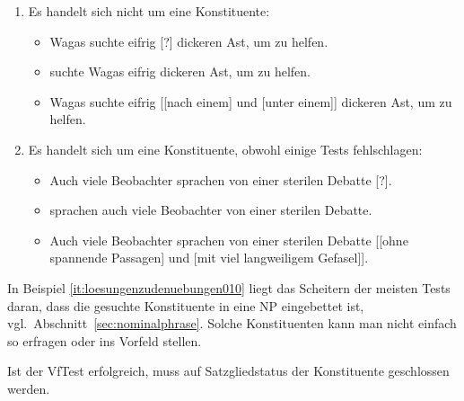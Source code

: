 \begin{enumerate}
\begin{itemize}
    \end{itemize}
  \item Es handelt sich nicht um eine Konstituente:
    \begin{itemize}
      \item \PronTest \Ast Wagas suchte eifrig [?] dickeren Ast, um zu helfen.
      \item \VfTest {} suchte Wagas eifrig dickeren Ast, um zu helfen.
      \item \KoorTest \Ast Wagas suchte eifrig [[nach einem] und [unter einem]] dickeren Ast, um zu helfen.
    \end{itemize}
  \item\label{it:loesungenzudenuebungen010} Es handelt sich um eine Konstituente, obwohl einige Tests fehlschlagen:
    \begin{itemize}
      \item \PronTest \Ast Auch viele Beobachter sprachen von einer sterilen Debatte [?].
      \item \VfTest {} sprachen auch viele Beobachter von einer sterilen Debatte.
      \item \KoorTest Auch viele Beobachter sprachen von einer sterilen Debatte [[ohne spannende Passagen] und [mit viel langweiligem Gefasel]].
    \end{itemize}
\end{enumerate}

In Beispiel \ref{it:loesungenzudenuebungen010} liegt das Scheitern der meisten Tests daran, dass die gesuchte Konstituente in eine NP eingebettet ist, vgl.\ Abschnitt~\ref{sec:nominalphrase}.
Solche Konstituenten kann man nicht einfach so erfragen oder ins Vorfeld stellen.

\label{sol:konstituentenstruktur02}

Ist der VfTest erfolgreich, muss auf Satzgliedstatus der Konstituente geschlossen werden.

